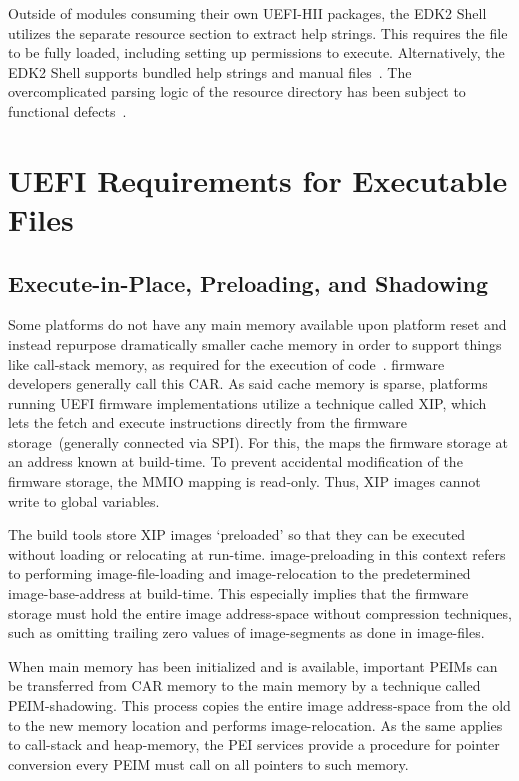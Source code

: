 Outside of modules consuming their own \gls{UEFI-HII} packages, the \gls{EDK2} Shell utilizes the separate  resource section to extract help strings. This requires the  file to be fully loaded, including setting up permissions to execute. Alternatively, the \gls{EDK2} Shell supports bundled help strings and manual files~\cite{edk2}. The overcomplicated parsing logic of the  resource directory has been subject to functional defects~\cite{secure-pe}.

\section{UEFI Requirements for Executable Files}

\subsection{Execute-in-Place, Preloading, and Shadowing}
\label{sec:peim_reqs}

Some platforms do not have any main memory available upon platform reset and instead repurpose dramatically smaller cache memory in order to support things like \gls{call-stack} memory, as required for the execution of  code~\cite{ISO:2018:III}. \Gls{firmware} developers generally call this \gls{CAR}. As said cache memory is sparse,  platforms running \gls{UEFI} \gls{firmware} implementations utilize a technique called \gls{XIP}, which lets the  fetch and execute instructions directly from the \gls{firmware} storage~(generally connected via \gls{SPI}). For this, the  maps the \gls{firmware} storage at an address known at build-time. To prevent accidental modification of the \gls{firmware} storage, the \gls{MMIO} mapping is read-only. Thus, \gls{XIP} \glspl{image} cannot write to global variables.

The build tools store \gls{XIP} \glspl{image} `preloaded' so that they can be executed without loading or relocating at run-time. \Gls{image-preloading} in this context refers to performing \gls{image-file-loading} and \gls{image-relocation} to the predetermined \gls{image-base-address} at build-time. This especially implies that the \gls{firmware} storage must hold the entire \gls{image} \gls{address-space} without compression techniques, such as omitting trailing zero values of \glspl{image-segment} as done in \glspl{image-file}.

When main memory has been initialized and is available, important \glspl{PEIM} can be transferred from \gls{CAR} memory to the main memory by a technique called \gls{PEIM-shadowing}. This process copies the entire \gls{image} \gls{address-space} from the old to the new memory location and performs \gls{image-relocation}. As the same applies to \gls{call-stack} and \gls{heap-memory}, the \gls{PEI} services provide a procedure for pointer conversion every \gls{PEIM} must call on all pointers to such memory.

